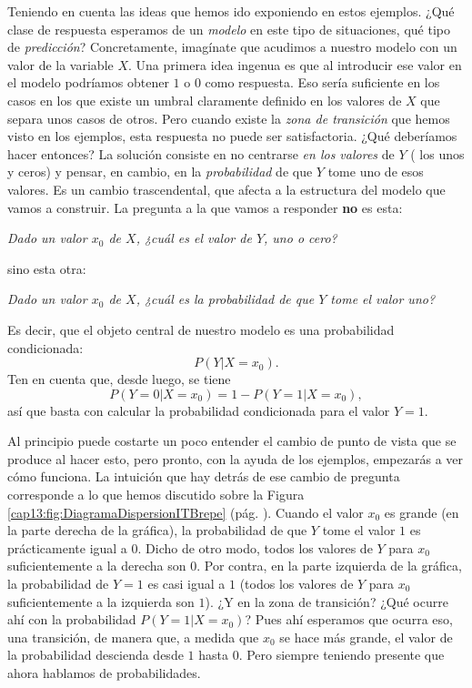 Teniendo en cuenta las ideas que hemos ido exponiendo en estos ejemplos. ¿Qué clase de respuesta  esperamos de un {\em modelo} en este tipo de situaciones, qué tipo de {\em predicción}? Concretamente, imagínate que acudimos a nuestro modelo con un valor de la variable $X$. Una primera idea ingenua es que al introducir ese valor en el modelo podríamos obtener $1$ o $0$ como respuesta.  Eso sería suficiente en los casos en los que existe un umbral claramente definido en los valores de $X$ que separa unos casos de otros. Pero cuando existe la {\em zona de transición} que hemos visto en los ejemplos, esta respuesta no puede ser satisfactoria. ¿Qué deberíamos hacer entonces? La solución consiste en no centrarse \emph{en los valores} de $Y$ ( los unos y ceros) y pensar, en cambio, en la {\em probabilidad} de que $Y$ tome uno de esos valores.  Es un cambio trascendental, que afecta a la estructura del modelo que vamos a construir. La pregunta a la que vamos a responder \textbf{no} es esta:
\begin{center}
	\emph{Dado un valor $x_0$ de $X$,  ¿cuál es el valor de $Y$, uno o cero?}
\end{center}
sino esta otra:
\begin{center}
	\emph{Dado un valor $x_0$ de $X$,  ¿cuál es la probabilidad de que $Y$ tome el valor  uno?}
\end{center}
Es decir, que el objeto central de nuestro modelo es una probabilidad condicionada:
\[P(Y | X= x_0).\]
Ten en cuenta que, desde luego, se tiene
\[P(Y=0|X=x_0)= 1 - P(Y=1|X=x_0),\]
así que basta con calcular la probabilidad condicionada para el valor $Y=1$.

Al principio puede costarte un poco entender el cambio de punto de vista que se produce al hacer esto, pero pronto, con la ayuda de los ejemplos, empezarás a ver cómo funciona. La intuición que hay detrás de ese cambio de pregunta corresponde a lo que hemos discutido sobre la Figura \ref{cap13:fig:DiagramaDispersionITBrepe} (pág. \pageref{cap13:fig:DiagramaDispersionITBrepe}). Cuando el valor $x_0$ es grande (en la parte derecha de la gráfica), la probabilidad de que $Y$ tome el valor $1$ es prácticamente igual a $0$. Dicho de otro modo,  todos los valores de $Y$ para $x_0$ suficientemente a  la derecha son $0$. Por contra, en la parte izquierda de la gráfica, la probabilidad de $Y=1$ es casi igual a $1$ (todos los valores de $Y$ para $x_0$ suficientemente a  la izquierda son $1$).   ¿Y en la zona de transición? ¿Qué ocurre ahí con la probabilidad $P(Y = 1| X= x_0)$? Pues ahí esperamos que ocurra eso, una transición, de manera que, a medida que $x_0$ se hace más grande, el valor de la probabilidad descienda desde $1$ hasta $0$.  Pero siempre teniendo presente que ahora hablamos de probabilidades.

